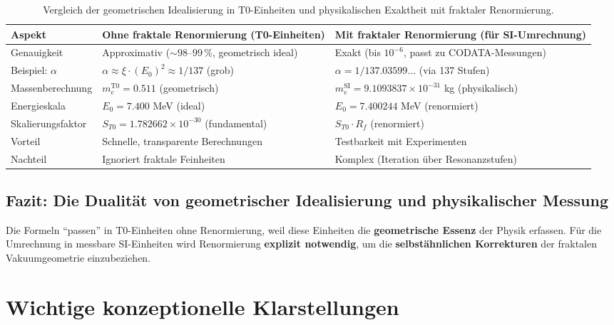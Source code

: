 \documentclass[12pt,a4paper]{article}
\begin{document}
	\begin{table}[h]
		\centering
		\begin{tabular}{p{4cm}p{6cm}p{6cm}}
			\toprule
			\textbf{Aspekt} & \textbf{Ohne fraktale Renormierung (T0-Einheiten)} & \textbf{Mit fraktaler Renormierung (für SI-Umrechnung)} \\
			\midrule
			Genauigkeit & Approximativ ($\sim 98$--$99$\,\%, geometrisch ideal) & Exakt (bis $10^{-6}$, passt zu CODATA-Messungen) \\
			Beispiel: $\alpha$ & $\alpha \approx \xi \cdot (E_0)^2 \approx 1/137$ (grob) & $\alpha = 1/137.03599\dots$ (via 137 Stufen) \\
			Massenberechnung & $m_e^{\mathrm{T0}} = 0.511$ (geometrisch) & $m_e^{\mathrm{SI}} = 9.1093837\times 10^{-31}$ kg (physikalisch) \\
			Energieskala & $E_0 = 7.400$ MeV (ideal) & $E_0 = 7.400244$ MeV (renormiert) \\
			Skalierungsfaktor & $S_{T0} = 1.782662\times 10^{-30}$ (fundamental) & $S_{T0} \cdot R_f$ (renormiert) \\
			Vorteil & Schnelle, transparente Berechnungen & Testbarkeit mit Experimenten \\
			Nachteil & Ignoriert fraktale Feinheiten & Komplex (Iteration über Resonanzstufen) \\
			\bottomrule
		\end{tabular}
		\caption{Vergleich der geometrischen Idealisierung in T0-Einheiten und physikalischen Exaktheit mit fraktaler Renormierung.}
		\label{tab:approximation-exaktheit}
	\end{table}
	
	\subsection{Fazit: Die Dualität von geometrischer Idealisierung und physikalischer Messung}
	
	Die Formeln ``passen'' in T0-Einheiten ohne Renormierung, weil diese Einheiten die \textbf{geometrische Essenz} der Physik erfassen. Für die Umrechnung in messbare SI-Einheiten wird Renormierung \textbf{explizit notwendig}, um die \textbf{selbstähnlichen Korrekturen} der fraktalen Vakuumgeometrie einzubeziehen.
	
	\section{Wichtige konzeptionelle Klarstellungen}
	
\end{document}
